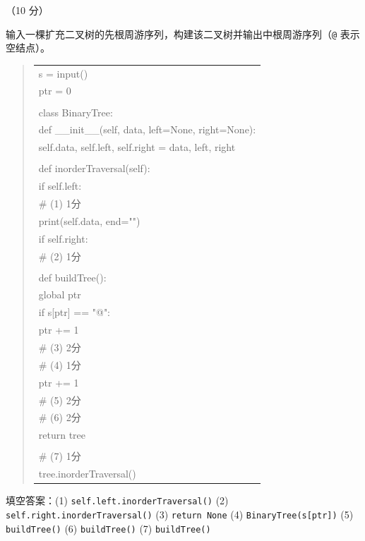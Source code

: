 \begin{question}[二叉树构建与中序遍历]（10 分）

输入一棵扩充二叉树的先根周游序列，构建该二叉树并输出中根周游序列（\texttt{@} 表示空结点）。

\begin{quote}
\footnotesize
\begin{tabular}{@{}l@{}}
s = input()\\
ptr = 0\\
\\
class BinaryTree:\\
    def \_\_init\_\_(self, data, left=None, right=None):\\
        self.data, self.left, self.right = data, left, right\\
\\
    def inorderTraversal(self):\\
        if self.left:\\
\underline{\hspace{12em}} \# (1) 1分\\
        print(self.data, end="")\\
        if self.right:\\
\underline{\hspace{12em}} \# (2) 1分\\
\\
def buildTree():\\
    global ptr\\
    if s[ptr] == "@":\\
        ptr += 1\\
\underline{\hspace{12em}} \# (3) 2分\\
\underline{\hspace{12em}} \# (4) 1分\\
    ptr += 1\\
\underline{\hspace{12em}} \# (5) 2分\\
\underline{\hspace{12em}} \# (6) 2分\\
    return tree\\
\\
\underline{\hspace{12em}} \# (7) 1分\\
tree.inorderTraversal()\\
\end{tabular}
\end{quote}

\begin{solution}
填空答案：(1) \texttt{self.left.inorderTraversal()} (2) \texttt{self.right.inorderTraversal()} (3) \texttt{return None} (4) \texttt{BinaryTree(s[ptr])} (5) \texttt{buildTree()} (6) \texttt{buildTree()} (7) \texttt{buildTree()}
\end{solution}
\end{question}

\clearpage

